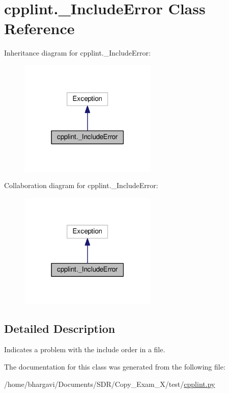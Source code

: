 \hypertarget{classcpplint_1_1___include_error}{}\section{cpplint.\+\_\+\+Include\+Error Class Reference}
\label{classcpplint_1_1___include_error}


Inheritance diagram for cpplint.\+\_\+\+Include\+Error\+:
\nopagebreak
\begin{figure}[H]
\begin{center}
\leavevmode
\includegraphics[width=186pt]{classcpplint_1_1___include_error__inherit__graph}
\end{center}
\end{figure}


Collaboration diagram for cpplint.\+\_\+\+Include\+Error\+:
\nopagebreak
\begin{figure}[H]
\begin{center}
\leavevmode
\includegraphics[width=186pt]{classcpplint_1_1___include_error__coll__graph}
\end{center}
\end{figure}


\subsection{Detailed Description}
\begin{DoxyVerb}Indicates a problem with the include order in a file.\end{DoxyVerb}
 

The documentation for this class was generated from the following file\+:\begin{DoxyCompactItemize}
\item 
/home/bhargavi/\+Documents/\+S\+D\+R/\+Copy\+\_\+\+Exam\+\_\+X/test/\hyperlink{cpplint_8py}{cpplint.\+py}\end{DoxyCompactItemize}
